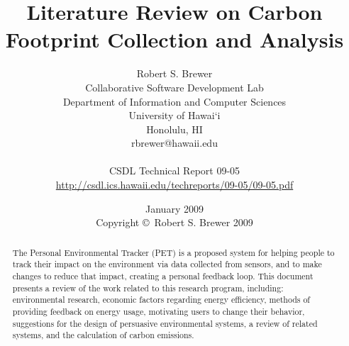 \documentclass[11pt]{report}
\begin{document}
\title{Literature Review on Carbon Footprint Collection and Analysis}
\author{Robert S. Brewer \\
Collaborative Software Development Lab \\
Department of Information and Computer Sciences \\
University of Hawai`i \\
Honolulu, HI \\
rbrewer@hawaii.edu \\
\\
CSDL Technical Report 09-05 \\
\url{http://csdl.ics.hawaii.edu/techreports/09-05/09-05.pdf}
}
\date{January 2009\\[3pt]
Copyright \copyright\ Robert S. Brewer 2009}

\maketitle

\tableofcontents

\begin{abstract}
The Personal Environmental Tracker (PET) is a proposed system for helping people to track their impact on the environment via data collected from sensors, and to make changes to reduce that impact, creating a personal feedback loop. This document presents a review of the work related to this research program, including: environmental research, economic factors regarding energy efficiency, methods of providing feedback on energy usage, motivating users to change their behavior, suggestions for the design of persuasive environmental systems, a review of related systems, and the calculation of carbon emissions.
\end{abstract}










%
%
\end{document}
